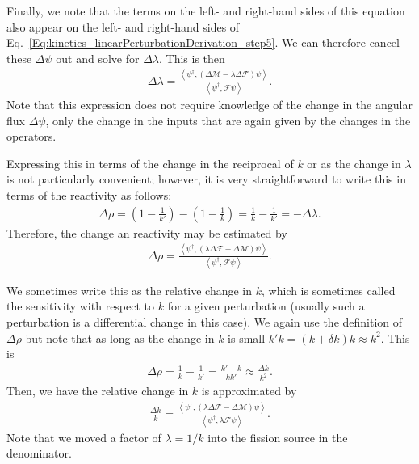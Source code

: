 Finally, we note that the terms on the left- and right-hand sides of this equation also appear on the left- and right-hand sides of Eq.~\eqref{Eq:kinetics_linearPerturbationDerivation_step5}. We can therefore cancel these $\Delta \psi$ out and solve for $\Delta \lambda$. This is then
\begin{align}
  \Delta \lambda = \frac{ \left< \psi^\dagger, ( \Delta \mathcal{M} - \lambda \Delta \mathcal{F} ) \psi \right> }{ \left< \psi^\dagger, \mathcal{F} \psi \right> }. \label{Eq:kinetics_linearPerturbation_DeltaLambda}
\end{align}
Note that this expression does not require knowledge of the change in the angular flux $\Delta \psi$, only the change in the inputs that are again given by the changes in the operators.

Expressing this in terms of the change in the reciprocal of $k$ or as the change in $\lambda$ is not particularly convenient; however, it is very straightforward to write this in terms of the reactivity as follows:
\begin{align}
  \Delta \rho 
  = \left( 1 - \frac{1}{k'} \right) - \left( 1 - \frac{1}{k} \right)
  = \frac{1}{k} - \frac{1}{k'}
  = -\Delta \lambda .
\end{align}
Therefore, the change an reactivity may be estimated by
\begin{align}
  \Delta \rho = \frac{ \left< \psi^\dagger, (  \lambda \Delta \mathcal{F} - \Delta \mathcal{M} ) \psi \right> }{ \left< \psi^\dagger, \mathcal{F} \psi \right> }. \label{Eq:kinetics_linearPerturbation_DeltaLambda}
\end{align}

We sometimes write this as the relative change in $k$, which is sometimes called the sensitivity with respect to $k$ for a given perturbation (usually such a perturbation is a differential change in this case). We again use the definition of $\Delta \rho$ but note that as long as the change in $k$ is small $k' k = ( k + \delta k ) k \approx k^2$. This is
\begin{align}
  \Delta \rho 
  = \frac{1}{k} - \frac{1}{k'}
  = \frac{k' - k}{k k'}
  \approx \frac{\Delta k}{k^2}.
\end{align}
Then, we have the relative change in $k$ is approximated by
\begin{align}
  \frac{ \Delta k }{ k } = \frac{ \left< \psi^\dagger, (  \lambda \Delta \mathcal{F} - \Delta \mathcal{M} ) \psi \right> }{ \left< \psi^\dagger, \lambda \mathcal{F} \psi \right> }. \label{Eq:kinetics_linearPerturbation_DeltaLambda}
\end{align}
Note that we moved a factor of $\lambda = 1/k$ into the fission source in the denominator.

